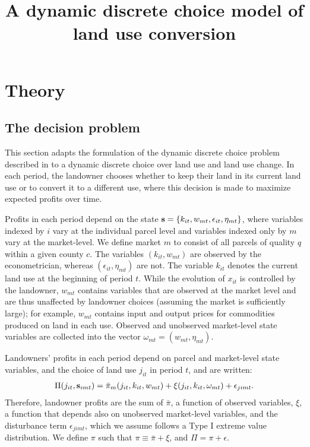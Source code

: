 \documentclass[11pt]{article}
\begin{document}
\title{{\bf A dynamic discrete choice model of land use conversion}}


\maketitle

\section{Theory}

\subsection{The decision problem}

This section adapts the formulation of the dynamic discrete choice problem described in \citet{kalouptsidi2020} to a dynamic discrete choice over land use and land use change. In each period, the landowner chooses whether to keep their land in its current land use or to convert it to a different use, where this decision is made to maximize expected profits over time. 

Profits in each period depend on the state ${\bf s} = \{k_{it},w_{mt},\epsilon_{it},\eta_{mt}\}$, where variables indexed by $i$ vary at the individual parcel level and variables indexed only by $m$ vary at the market-level. We define market $m$ to consist of all parcels of quality $q$ within a given county $c$. The variables $(k_{it},w_{mt})$ are observed by the econometrician, whereas $(\epsilon_{it},\eta_{mt})$ are not. The variable $k_{it}$ denotes the current land use at the beginning of period $t$. While the evolution of $x_{it}$ is controlled by the landowner, $w_{mt}$ contains variables that are observed at the market level and are thus unaffected by landowner choices (assuming the market is sufficiently large); for example, $w_{mt}$ contains input and output prices for commodities produced on land in each use. Observed and unobserved market-level state variables are collected into the vector $\omega_{mt} = (w_{mt},\eta_{mt})$. 

Landowners' profits in each period depend on parcel and market-level state variables, and the choice of land use $j_{it}$ in period $t$, and are written:
\begin{align}
\Pi(j_{it},{\bf s}_{imt}) = \bar{\pi}_m(j_{it},k_{it},w_{mt}) + \xi(j_{it},k_{it},\omega_{mt}) + \epsilon_{jimt}.
\end{align}
Therefore, landowner profits are the sum of $\bar{\pi}$, a function of observed variables, $\xi$, a function that depends also on unobserved market-level variables, and the  disturbance term $\epsilon_{jimt}$, which we assume follows a Type I extreme value distribution. We define $\pi$ such that $\pi \equiv \bar{\pi} + \xi$, and $\Pi = \pi + \epsilon$.
\end{document}
